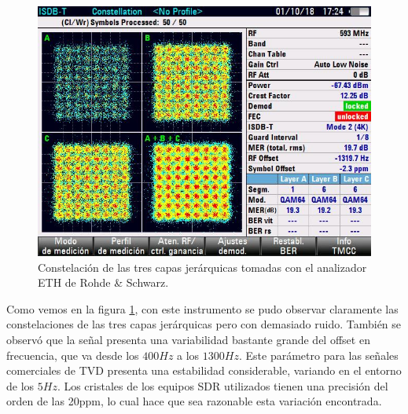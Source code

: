 \begin{figure}[!h]
	\centering
	\includegraphics[scale=0.6]{figuras/cap06/constelacion_eth}
	\caption{\label{f:calidad_imagen} Constelación de las tres capas jerárquicas tomadas con el analizador ETH de Rohde \& Schwarz.}
\end{figure}

Como vemos en la figura \ref{f:calidad_imagen}, con este instrumento se pudo observar claramente las constelaciones de las tres capas jerárquicas pero con demasiado ruido. También se observó que la señal presenta una variabilidad bastante grande del offset en frecuencia, que va desde los $400Hz$ a los $1300Hz$. Este parámetro para las señales comerciales de TVD presenta una estabilidad considerable, variando en el entorno de los $5Hz$. Los cristales de los equipos SDR utilizados tienen una precisión del orden de las 20ppm, lo cual hace que sea razonable esta variación encontrada.

